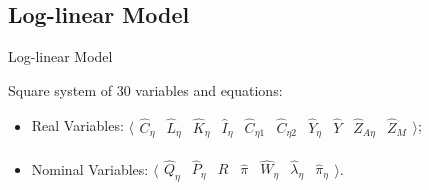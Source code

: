 \documentclass[../quali_slides.tex]{subfiles}
\begin{document}

\subsection{Log-linear Model}

\begin{frame}[allowframebreaks]{Log-linear Model}

Square system of 30 variables and equations:
	
\begin{itemize}
	
	\item Real Variables: $\langle \begin{matrix} \hat{C}_{\eta } & \hat{L}_{\eta } & \hat{K}_{\eta} & \hat{I}_{\eta} & \hat{C}_{\eta 1} & \hat{C}_{\eta 2} & \hat{Y}_{\eta } & \hat{Y}_{} & \hat{Z}_{A\eta } & \hat{Z}_{M} \end{matrix} \rangle$;
	
	\item Nominal Variables: $\langle \begin{matrix} \hat{Q}_{\eta} & \hat{P}_{\eta } & \hat{R}_{} & \hat{\pi}_{} & \hat{W}_{\eta } & \hat{\lambda}_{\eta } & \hat{\pi}_{\eta } \end{matrix} \rangle$.
	
\end{itemize}
	
\end{frame}

\end{document}

